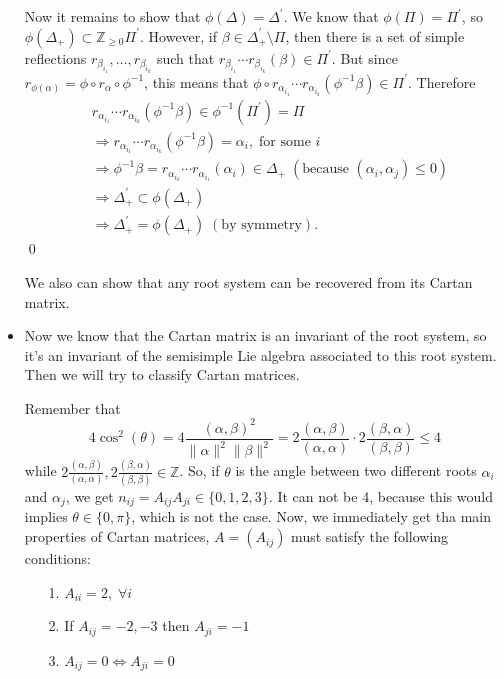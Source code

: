 \begin{itemize}
Now it remains to show that $\phi(\Delta)=\Delta^\prime$. We know that $\phi(\Pi)=\Pi^\prime$, so 
$\phi(\Delta_+)\subset \mathbb{Z}_{\geq0}\Pi^\prime$. However, if $\beta\in\Delta_+^\prime\setminus\Pi$, then there is a 
set of simple reflections $r_{\beta_{i_1}},\dots,r_{\beta_{i_k}}$ such that 
$r_{\beta_{i_1}}\cdots r_{\beta_{i_k}}(\beta)\in \Pi^\prime$. But since $r_{\phi(\alpha)}=\phi\circ r_\alpha\circ \phi^{-1}$, this 
means that $\phi\circ r_{\alpha_{i_1}}\cdots r_{\alpha_{i_k}}(\phi^{-1}\beta)\in\Pi^\prime$. Therefore 
\begin{equation}
    \begin{split}
        &r_{\alpha_{i_1}}\cdots r_{\alpha_{i_k}}(\phi^{-1}\beta)\in\phi^{-1}(\Pi^\prime)=\Pi\\
        &\Rightarrow r_{\alpha_{i_1}}\cdots r_{\alpha_{i_k}}(\phi^{-1}\beta)=\alpha_i,\;\text{for some }i\\
        &\Rightarrow \phi^{-1}\beta=r_{\alpha_{i_k}}\cdots r_{\alpha_{i_1}}(\alpha_i)\in\Delta_+\;
        (\text{because }(\alpha_i,\alpha_j)\leq0)\\
        &\Rightarrow \Delta_+^\prime\subset\phi(\Delta_+)\\
        &\Rightarrow \Delta_+^\prime=\phi(\Delta_+)\;(\text{by symmetry}).
    \end{split}
\end{equation}
\qed

\begin{dang}
    \begin{remark}
        We also can show that any root system can be recovered from its Cartan matrix.
    \end{remark}
\end{dang}

\item Now we know that the Cartan matrix is an invariant of the root system, so it's an invariant of the semisimple Lie algebra 
associated to this root system. Then we will try to classify Cartan matrices. \par 
Remember that 
\begin{equation}
    4\cos^2(\theta)=4\frac{(\alpha,\beta)^2}{\|\alpha\|^2\|\beta\|^2}=2\frac{(\alpha,\beta)}{(\alpha,\alpha)}\cdot 
    2\frac{(\beta,\alpha)}{(\beta,\beta)}\leq 4
\end{equation}
while $2\tfrac{(\alpha,\beta)}{(\alpha,\alpha)},2\tfrac{(\beta,\alpha)}{(\beta,\beta)}\in\mathbb{Z}$. So, if 
$\theta$ is the angle between two different roots $\alpha_i$ and $\alpha_j$, we get $n_{ij}=A_{ij}A_{ji}\in\{0,1,2,3\}$. It 
can not be 4, because this would implies $\theta\in\{0,\pi\}$, which is not the case. Now, we immediately get 
tha main properties of Cartan matrices, $A=(A_{ij})$ must satisfy the following conditions:
\begin{itemize}
    \item[1.] $A_{ii}=2,\;\forall i$ 
    \item[2.] If $A_{ij}=-2,-3$ then $A_{ji}=-1$
    \item[3.] $A_{ij}=0\iff A_{ji}=0$
\end{itemize} 


\end{itemize}
